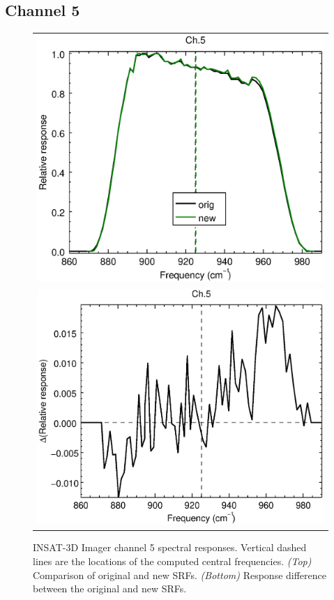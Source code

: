 \subsection{Channel 5}
\begin{figure}[H]
  \centering
  \begin{tabular}{c}
    \includegraphics[scale=0.55]{graphics/imgr/srf/imgr_insat3d-5.eps} \\
    \includegraphics[scale=0.55]{graphics/imgr/srf/imgr_insat3d-5.difference.eps}
  \end{tabular}
  \caption{INSAT-3D Imager channel 5 spectral responses. Vertical dashed lines are the locations of the computed central frequencies. \emph{(Top)} Comparison of original and new SRFs. \emph{(Bottom)} Response difference between the original and new SRFs.}
  \label{fig:imgr_ch5}
\end{figure}


